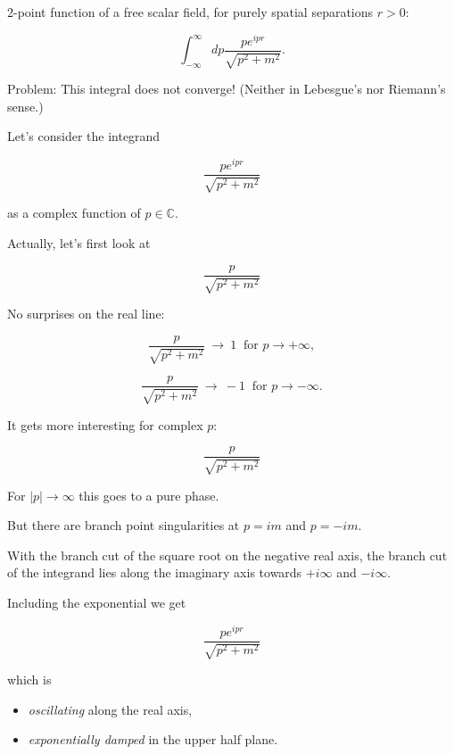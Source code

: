 \documentclass{beamer}
\newcommand{\envelope}{\frac{p}{\sqrt{p^2 + m^2}}}
\newcommand{\integrand}{\frac{p e^{ipr}}{\sqrt{p^2 + m^2}}}
\newcommand{\CC}{\mathbb{C}}
\begin{document}
\begin{frame}
2-point function of a free scalar field, for purely spatial separations $r > 0$:

$$\int_{-\infty}^{\infty} dp \integrand.$$

Problem: This integral does not converge! (Neither in Lebesgue's
nor Riemann's sense.)
\end{frame}


\begin{frame}
Let's consider the integrand

$$\integrand$$

as a complex function of $p \in \CC$.

\end{frame}


\begin{frame}
Actually, let's first look at

$$\envelope$$

No surprises on the real line:

$$\envelope \ \rightarrow \ 1 \ \textrm{ for } p \rightarrow +\infty,$$

$$\envelope \ \rightarrow \ -1 \ \textrm{ for } p \rightarrow -\infty.$$

\end{frame}



\begin{frame}
It gets more interesting for complex $p$:

$$\envelope$$

For $|p| \rightarrow \infty$ this goes to  a pure phase.

But there are branch point singularities at $p = im$ and $p = -im$.

With the branch cut of the square root on the negative real axis,
the branch  cut of the integrand lies along the imaginary axis towards $+i\infty$ and $-i\infty$.
\end{frame}



\begin{frame}
Including the exponential we get

$$\integrand$$

which is

\begin{itemize}
\item \emph{oscillating} along the real axis,

\item \emph{exponentially damped} in the upper half plane.
\end{itemize}
\end{frame}
\end{document}
